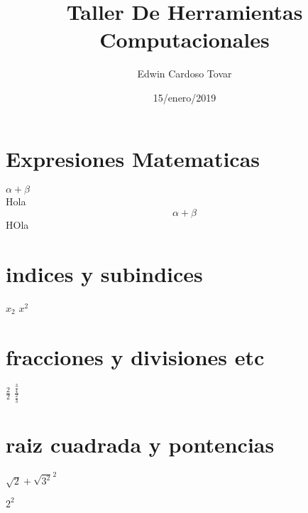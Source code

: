 \documentclass{article}
\title{\Huge Taller De Herramientas Computacionales}
\author{Edwin Cardoso Tovar}
\date{15/enero/2019}
\begin{document}
\maketitle
\begin{center}
	
\end{center}
\newpage
\section*{Expresiones Matematicas}
$\alpha + \beta$\\ %
Hola\[\alpha + \beta\]HOla %

\section*{indices y subindices}%
$x_{2}$
$x^{2}$\\

\section*{fracciones y divisiones etc}
$\frac{2}{2}$
$\frac{\frac{3}{4}}{\frac{2}{3}}$

\section{raiz cuadrada y pontencias}
$\sqrt{2} + \sqrt{3^2}^2$



$2^2$
\end{document}
